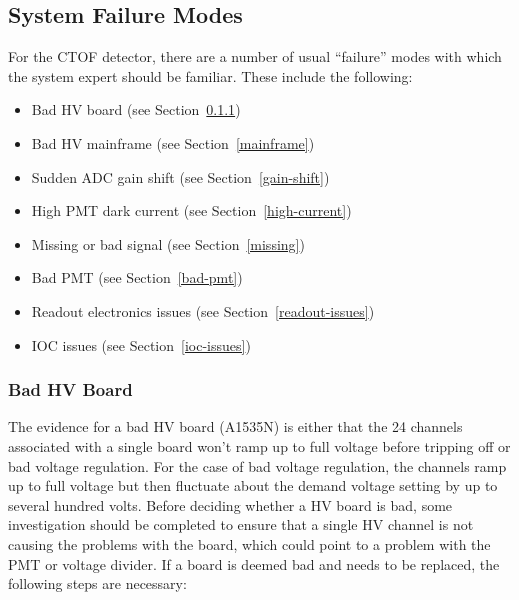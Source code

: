 \documentclass[12pt]{article}
\begin{document}
\subsection{System Failure Modes}
\label{repairs}

For the CTOF detector, there are a number of usual ``failure'' modes with which the 
system expert should be familiar. These include the following:

\begin{itemize}
\item Bad HV board (see Section~\ref{board-swap})
\item Bad HV mainframe (see Section~\ref{mainframe})
\item Sudden ADC gain shift (see Section~\ref{gain-shift})
\item High PMT dark current (see Section~\ref{high-current})
\item Missing or bad signal (see Section~\ref{missing})
\item Bad PMT (see Section~\ref{bad-pmt})
\item Readout electronics issues (see Section~\ref{readout-issues})
\item IOC issues (see Section~\ref{ioc-issues})
\end{itemize}

\subsubsection{Bad HV Board}
\label{board-swap}

The evidence for a bad HV board (A1535N) is either that the 24 channels associated 
with a single board won't ramp up to full voltage before tripping off or bad voltage 
regulation. For the case of bad voltage regulation, the channels ramp up to full 
voltage but then fluctuate about the demand voltage setting by up to several hundred 
volts. Before deciding whether a HV board is bad, some investigation should be 
completed to ensure that a single HV channel is not causing the problems with the 
board, which could point to a problem with the PMT or voltage divider. If a board is 
deemed bad and needs to be replaced, the following steps are necessary:
\end{document}
